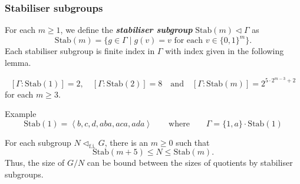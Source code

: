 \documentclass[aspectratio=169,10pt]{beamer}
\renewcommand{\leq}{\leqslant}
\renewcommand{\geq}{\geqslant}
\renewcommand{\emph}[1]{\textit{\bfseries{\color{OwlYellow}#1}}}
\newcommand\Grig{{\Gamma}}
\begin{document}

\begin{frame}[t]
	\frametitle{Stabiliser subgroups}

	For each $m\geq 1$, we define the \emph{stabiliser subgroup} $\mathrm{Stab}(m) \triangleleft \Grig$ as
	\[
		\mathrm{Stab}(m)
		=
		\{
		g\in \Grig
		\mid
		g(v) = v
		\text{ for each }
		v\in \{0,1\}^m
		\}.
	\]
	Each stabiliser subgroup is finite index in $\Grig$ with index given in the following lemma.

	\pause

	\begin{lemma}%
		\vspace{-1ex}
		\[
			[\Grig:\mathrm{Stab}(1)] = 2,\quad
			[\Grig:\mathrm{Stab}(2)] = 8\quad\text{and}\quad
			[\Grig:\mathrm{Stab}(m)] = 2^{5\cdot 2^{m-3}+2}
		\]
		for each $m \geq 3$.
	\end{lemma}

	\begin{block}{Example}
		\vspace{-1ex}
		\[
			\mathrm{Stab}(1)
			=
			\left\langle
			b,c,d,aba,aca,ada
			\right\rangle
			\qquad
			\text{where}
			\qquad
			\Grig = \{1,a\}\cdot \mathrm{Stab}(1)
		\]
	\end{block}

	\pause

	\begin{lemma}
		For each subgroup $N \triangleleft_{\mathrm{f.i.}} G$, there is an $m \geq 0$ such that
		\[
			\mathrm{Stab}(m+5)
			\leq
			N
			\leq
			\mathrm{Stab}(m).
		\]
		Thus, the size of $G/N$ can be bound between the sizes of quotients by stabiliser subgroups.
	\end{lemma}
\end{frame}

\end{document}
